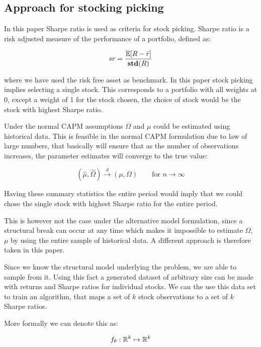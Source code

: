 \subsection{Approach for stocking picking}

In this paper Sharpe ratio is used as criteria for stock picking. Sharpe ratio is a risk adjusted measure of the performance of a portfolio, defined as:

\begin{equation}
 sr = \frac{\mathbb{E}[R - \bar{r}]}{\mathbf{std}(R)}
\end{equation}

where we have used the risk free asset as benchmark. In this paper stock picking implies selecting a single stock. This corresponds to a portfolio with all weights at 0, except a weight of 1 for the stock chosen, the choice of stock would be the stock with highest Sharpe ratio.

Under the normal CAPM assumptions $\Omega$ and $\mu$ could be estimated using historical data. This is feasible in the normal CAPM formulation due to law of large numbers, that basically will ensure that as the number of observations increases, the parameter estimates will converge to the true value:

\begin{equation}
    (\hat{\mu}, \hat{\Omega}) \overset{d}{\rightarrow} (\mu, \Omega) \qquad \text{for } n \rightarrow \infty
\end{equation}

Having these summary statistics the entire period would imply that we could chose the single stock with highest Sharpe ratio for the entire period.

This is however not the case under the alternative model formulation, since a structural break can occur at any time which makes it impossible to estimate $\Omega$, $\mu$ by using the entire sample of historical data. A different approach is therefore taken in this paper.

Since we know the structural model underlying the problem, we are able to sample from it. Using this fact a generated dataset of arbitrary size can be made with returns and Sharpe ratios for individual stocks. We can the use this data set to train an algorithm, that maps a set of $k$ stock observations to a set of $k$ Sharpe ratios.

More formally we can denote this as:

\begin{equation}
    f_{\theta}: \mathbb{R}^{k} \mapsto \mathbb{R}^{k}
\end{equation}

